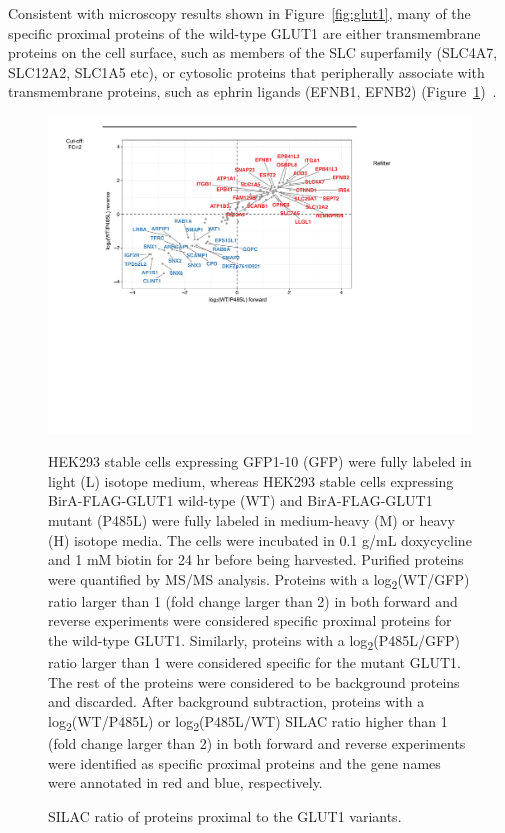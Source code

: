 Consistent with microscopy results shown in Figure~\ref{fig:glut1}, many of the specific proximal proteins of the wild-type GLUT1 are either transmembrane proteins on the cell surface, such as members of the SLC superfamily (SLC4A7, SLC12A2, SLC1A5 etc), or cytosolic proteins that peripherally associate with transmembrane proteins, such as ephrin ligands (EFNB1, EFNB2) (Figure~\ref{fig:bioid2})~\cite{He,Himanen}. 
\begin{figure}[h]
\centering
\includegraphics[scale=0.7]{Figures/bioid2}
\caption{SILAC ratio of proteins proximal to the GLUT1 variants.}
\vspace*{-3mm}
\small \justify
HEK293 stable cells expressing GFP1-10 (GFP) were fully labeled in light (L) isotope medium, whereas HEK293 stable cells expressing BirA-FLAG-GLUT1 wild-type (WT) and BirA-FLAG-GLUT1 mutant (P485L) were fully labeled in medium-heavy (M) or heavy (H) isotope media. The cells were incubated in 0.1 \textmu g/mL doxycycline and 1 mM biotin for 24 hr before being harvested. Purified proteins were quantified by MS/MS analysis. Proteins with a log\textsubscript{2}(WT/GFP) ratio larger than 1 (fold change larger than 2) in both forward and reverse experiments were considered specific proximal proteins for the wild-type GLUT1. Similarly, proteins with a log\textsubscript{2}(P485L/GFP) ratio larger than 1 were considered specific for the mutant GLUT1. The rest of the proteins were considered to be background proteins and discarded. After background subtraction, proteins with a log\textsubscript{2}(WT/P485L) or log\textsubscript{2}(P485L/WT) SILAC ratio higher than 1 (fold change larger than 2) in both forward and reverse experiments were identified as specific proximal proteins and the gene names were annotated in red and blue, respectively.
\label{fig:bioid2}
\end{figure}

